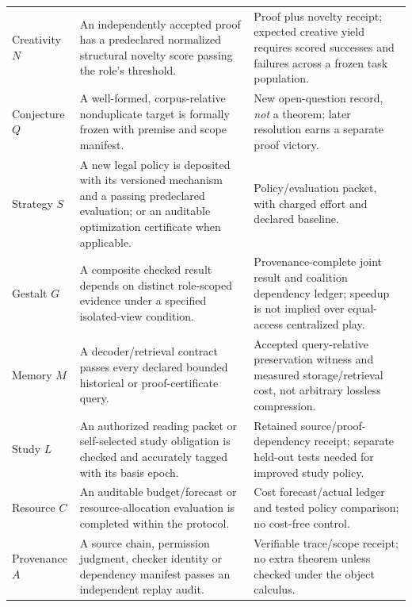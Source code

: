 \documentclass[11pt,letterpaper]{article}
\theoremstyle{definition}
\theoremstyle{plain}
\theoremstyle{definition}
\begin{document}
\begin{longtable}{@{}p{.155\linewidth}p{.355\linewidth}p{.395\linewidth}@{}}
Creativity $N$ & An independently accepted proof has a predeclared normalized structural novelty score passing the role's threshold. & Proof plus novelty receipt; expected creative yield requires scored successes and failures across a frozen task population.\\[3pt]
Conjecture $Q$ & A well-formed, corpus-relative nonduplicate target is formally frozen with premise and scope manifest. & New open-question record, \emph{not} a theorem; later resolution earns a separate proof victory.\\[3pt]
Strategy $S$ & A new legal policy is deposited with its versioned mechanism and a passing predeclared evaluation; or an auditable optimization certificate when applicable. & Policy/evaluation packet, with charged effort and declared baseline.\\[3pt]
Gestalt $G$ & A composite checked result depends on distinct role-scoped evidence under a specified isolated-view condition. & Provenance-complete joint result and coalition dependency ledger; speedup is not implied over equal-access centralized play.\\[3pt]
Memory $M$ & A decoder/retrieval contract passes every declared bounded historical or proof-certificate query. & Accepted query-relative preservation witness and measured storage/retrieval cost, not arbitrary lossless compression.\\[3pt]
Study $L$ & An authorized reading packet or self-selected study obligation is checked and accurately tagged with its basis epoch. & Retained source/proof-dependency receipt; separate held-out tests needed for improved study policy.\\[3pt]
Resource $C$ & An auditable budget/forecast or resource-allocation evaluation is completed within the protocol. & Cost forecast/actual ledger and tested policy comparison; no cost-free control.\\[3pt]
Provenance $A$ & A source chain, permission judgment, checker identity or dependency manifest passes an independent replay audit. & Verifiable trace/scope receipt; no extra theorem unless checked under the object calculus.\\
\bottomrule
\end{longtable}
\normalsize
\end{document}
